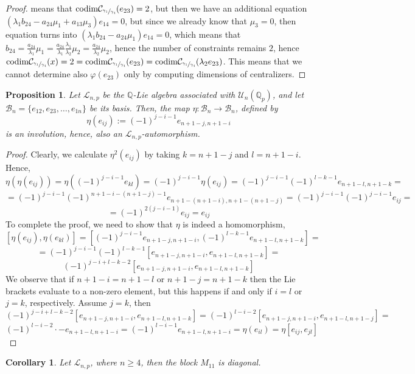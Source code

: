 \documentclass[12pt,fleqn]{article}
\newcommand*\circled[1]{\tikz[baseline=(char.base)]{
            \small \node[shape=circle,draw,inner sep=1pt] (char) {#1};}}
\newtheorem{proposition}[theorem]{Proposition}
\newtheorem{corollary}[theorem]{Corollary}
\begin{document}
\begin{proof}
means that $\mathrm{codim}\mathcal{C}_{\sfrac{\gamma_1}{\gamma_4}}(e_{23})=2$, but then we have an additional equation \circled{4} $(\lambda_1 b_{24}-a_{24}\mu_1+a_{13}\mu_3)e_{14}=0$, but since we already know that $\mu_3=0$, then equation \circled{4} turns into $(\lambda_1 b_{24}-a_{24}\mu_1)e_{14}=0$, which means that $b_{24}=\frac{a_{24}}{\lambda_1}\mu_1=\frac{a_{24}}{\lambda_1}\frac{\lambda_1}{\lambda_2}\mu_2=\frac{a_{24}}{\lambda_2}\mu_2$, hence the number of constraints remains $2$, hence $\mathrm{codim}\mathcal{C}_{\sfrac{\gamma_1}{\gamma_4}}(x)=2=\mathrm{codim}\mathcal{C}_{\sfrac{\gamma_1}{\gamma_4}}(e_{23})=\mathrm{codim}\mathcal{C}_{\sfrac{\gamma_1}{\gamma_4}}(\lambda_2 e_{23})$. This means that we cannot determine also $\varphi(e_{23})$ only by computing dimensions of centralizers.
\end{proof}
\begin{proposition}
\label{prop.involution}
Let $\mathcal{L}_{n,p}$ be the $\mathbb{Q}$-Lie algebra associated with $\mathcal{U}_n(\mathbb{Q}_p)$, and let $\mathcal{B}_n=\{e_{12},e_{23},\dots,e_{1n}\}$ be its basis. Then, the map $\eta:\mathcal{B}_n\rightarrow \mathcal{B}_n$, defined by \[\eta(e_{ij}):=(-1)^{j-i-1}e_{n+1-j,n+1-i}\] is an involution, hence, also an $\mathcal{L}_{n,p}$-automorphism.
\end{proposition}
\begin{proof}
Clearly, we calculate $\eta^2(e_{ij})$ by taking $k=n+1-j$ and $l=n+1-i$. Hence, \[\eta(\eta(e_{ij}))=\eta((-1)^{j-i-1}e_{kl})=(-1)^{j-i-1}\eta(e_{ij})=(-1)^{j-i-1}(-1)^{l-k-1}e_{n+1-l,n+1-k}=\]\[=(-1)^{j-i-1}(-1)^{n+1-i-(n+1-j)-1}e_{n+1-(n+1-i),n+1-(n+1-j)}=(-1)^{j-i-1}(-1)^{j-i-1}e_{ij}=\]\[=(-1)^{2(j-i-1)}e_{ij}=e_{ij}\]
To complete the proof, we need to show that $\eta$ is indeed a homomorphism,
\[[\eta(e_{ij}),\eta(e_{kl})]=[(-1)^{j-i-1}e_{n+1-j,n+1-i},(-1)^{l-k-1}e_{n+1-l,n+1-k}]=\]\[=(-1)^{j-i-1}(-1)^{l-k-1}[e_{n+1-j,n+1-i},e_{n+1-l,n+1-k}]=\]\[(-1)^{j-i+l-k-2}[e_{n+1-j,n+1-i},e_{n+1-l,n+1-k}]\]
We observe that if $n+1-i=n+1-l$ or $n+1-j=n+1-k$ then the Lie brackets evaluate to a non-zero element, but this happens if and only if $i=l$ or $j=k$, respectively. Assume $j=k$, then \[(-1)^{j-i+l-k-2}[e_{n+1-j,n+1-i},e_{n+1-l,n+1-k}]=(-1)^{l-i-2}[e_{n+1-j,n+1-i},e_{n+1-l,n+1-j}]=\]\[(-1)^{l-i-2}\cdot-e_{n+1-l,n+1-i}=(-1)^{l-i-1}e_{n+1-l,n+1-i}=\eta(e_{il})=\eta[e_{ij},e_{jl}]\] 
\end{proof}
\begin{corollary}
\label{m11.diagonal}
Let $\mathcal{L}_{n,p}$, where $n\geq 4$, then the block $M_{11}$ is diagonal.
\end{corollary}
\end{document}
